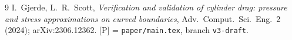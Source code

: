 \documentclass[11pt,reqno]{amsart}
\theoremstyle{plain}
\theoremstyle{definition}
\begin{document}
\begin{thebibliography}{9}
 I.~Gjerde, L.~R.~Scott, \emph{Verification and validation of cylinder drag: pressure and stress approximations on curved boundaries}, Adv.\ Comput.\ Sci.\ Eng.\ 2 (2024); arXiv:2306.12362.
 [P] = \texttt{paper/main.tex}, branch \texttt{v3-draft}.
\end{thebibliography}
\end{document}
